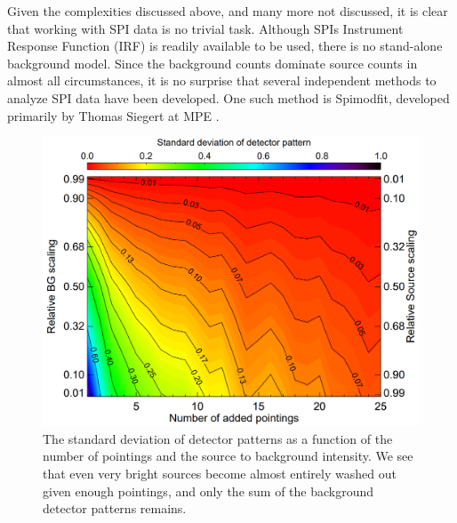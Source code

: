 \documentclass{report}
\begin{document}
Given the complexities discussed above, and many more not discussed, it is clear that working with SPI data is no trivial task. Although SPIs Instrument Response Function (IRF) is readily available to be used, there is no stand-alone background model. Since the background counts dominate source counts in almost all circumstances, it is no surprise that several independent methods to analyze SPI data have been developed. One such method is Spimodfit, developed primarily by Thomas Siegert at MPE \cite{refId1} \cite{SMF_Cookbook}.

\begin{figure}
  \includegraphics[width=\linewidth]{Images/General/SMF_background_pattern_siegert_2019.PNG}
  \caption{The standard deviation of detector patterns as a function of the number of pointings and the source to background intensity. We see that even very bright sources become almost entirely washed out given enough pointings, and only the sum of the background detector patterns remains. \cite{refId1}}
  \vspace{-0pt}
  \label{smf_background_model_idea}
  \vspace{-5pt}
\end{figure}
\end{document}
